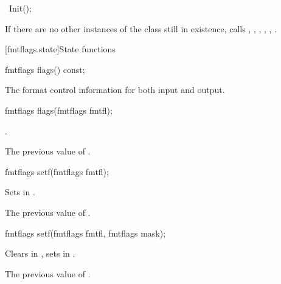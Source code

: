 %
\begin{itemdecl}
~Init();
\end{itemdecl}

\begin{itemdescr}
\pnum
\effects
If there are no other instances of the class still in existence,
calls
%
,
,
,
,
,
.
\end{itemdescr}

[fmtflags.state]{State functions}

%
\begin{itemdecl}
fmtflags flags() const;
\end{itemdecl}

\begin{itemdescr}
\pnum
\returns
The format control information for both input and output.
\end{itemdescr}

%
\begin{itemdecl}
fmtflags flags(fmtflags fmtfl);
\end{itemdecl}

\begin{itemdescr}
\pnum
\ensures
{}.

\pnum
\returns
The previous value of
.
\end{itemdescr}

%
\begin{itemdecl}
fmtflags setf(fmtflags fmtfl);
\end{itemdecl}

\begin{itemdescr}
\pnum
\effects
Sets  in
.

\pnum
\returns
The previous value of
.
\end{itemdescr}

%
\begin{itemdecl}
fmtflags setf(fmtflags fmtfl, fmtflags mask);
\end{itemdecl}

\begin{itemdescr}
\pnum
\effects
Clears  in
,
sets
in
.

\pnum
\returns
The previous value of
.
\end{itemdescr}

